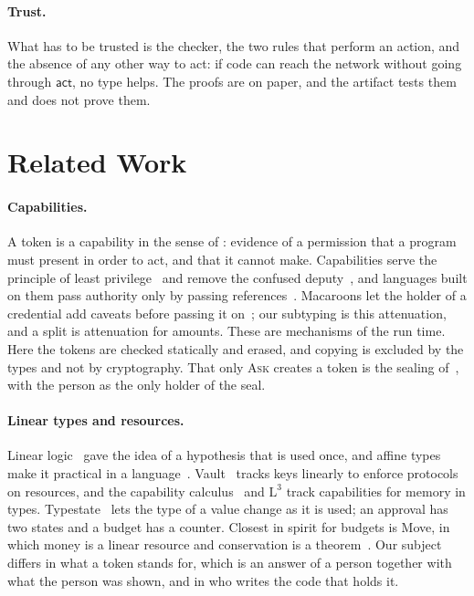 \documentclass[acmsmall,nonacm,screen]{acmart}
\newcommand{\kw}[1]{\mathsf{#1}}
\begin{document}
\paragraph{Trust.} What has to be trusted is the checker, the two rules that perform an
action, and the absence of any other way to act: if code can reach the network without going
through $\kw{act}$, no type helps. The proofs are on paper, and the artifact tests them and
does not prove them.

\section{Related Work}
\label{sec:related}

\paragraph{Capabilities.} A token is a capability in the sense of
\citet{dennis1966}: evidence of a permission that a program must present in order to act, and
that it cannot make. Capabilities serve the principle of least
privilege~\citep{saltzer1975} and remove the confused deputy~\citep{hardy1988}, and languages
built on them pass authority only by passing references~\citep{miller2006}. Macaroons let the
holder of a credential add caveats before passing it on~\citep{birgisson2014}; our subtyping
is this attenuation, and a split is attenuation for amounts. These are mechanisms of the run
time. Here the tokens are checked statically and erased, and copying is excluded by the types
and not by cryptography. That only \textsc{Ask} creates a token is the sealing
of~\citet{morris1973}, with the person as the only holder of the seal.

\paragraph{Linear types and resources.} Linear logic~\citep{girard1987} gave the idea of a
hypothesis that is used once, and affine types make it practical in a
language~\citep{tov2011}. Vault~\citep{deline2001} tracks keys linearly to enforce protocols
on resources, and the capability calculus~\citep{crary1999} and $\mathrm{L}^3$
\citep{morrisett2005} track capabilities for memory in types. Typestate~\citep{strom1986} lets the
type of a value change as it is used; an approval has two states and a budget has a counter.
Closest in spirit for budgets is Move, in which money is a linear resource and conservation is
a theorem~\citep{blackshear2020}. Our subject differs in what a token stands for, which is an
answer of a person together with what the person was shown, and in who writes the code that
holds it.
\end{document}

